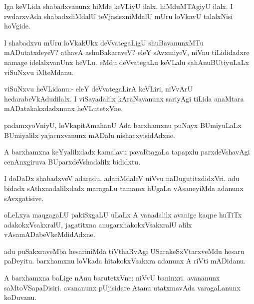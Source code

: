 \documentclass{article}
\begin{document}
\begin{mn}
Iga keVLida shabadxvanunx hiMde keVLiyU ilalx. hiMduMTAgiyU ilalx. I
rwdarxvAda shabadxdiMdalU teVjasisxniMdalU mUru loVkavU talalxNisi hoVgide.
\end{mn}

\begin{mn}
I shabadxvu mUru loVkakUkx deVvategaLigU shuBavanunxMTu mADutatxdeyeV?
athavA ashuBakaraveV? eleY sAvxmiyeV, niVnu tiLididadxre namage
idelalxvanUnx heVLu. eMdu deVvategaLu keVLalu sahAnuBUtiyuLaLx
viSuNxvu iMteMdanu.
\end{mn}

\begin{mn}
viSuNxvu heVLidanu:- eleY deVvategaLirA keVLiri, niVvArU
hedarabeVkAdudilalx. I viSayadalilx kAraNavanunx sariyAgi tiLida
anaMtara mADatakakxdadxnunx heVLutetxVne.
\end{mn}

\begin{mn}%
padamxyoVniyU, loVkapitAmahanU Ada barxhamxnu puNayx BUmiyuLaLx
BUmiyalilx yajacnxvanunx mADalu nishacxyisidAdxne.
\end{mn}

\begin{mn}
A barxhamxna keYyalilxdadx kamalavu pavaRtagaLa tapapxlu
parxdeVshavAgi cenAnxgiruva BUparxdeVshadalilx bididxtu.
\end{mn}

\begin{mn}
I doDaDx shabadxveV adaradu. adariMdaleV niVvu naDugutitxdidxVri. adu
bidadx sAthxnadalilxdadx maragaLu tamamx hUgaLa vAsaneyiMda adanunx sAvxgatisive.
\end{mn}

\begin{mn}
oLeLxya maqgagaLU pakiSxgaLU uLaLx A vanadalilx avanige kaqpe huTiTx
adakokxVsakxralU, jagatitxna anugarxhakokxVsakxralU alilx vAsamADabeVkeMdidAdxne.
\end{mn}

\begin{mn}
adu puSakxraveMba hesariniMda tiVthaRvAgi USarakeSxVtarxveMdu hesaru
paDeyitu. barxhamxnu loVkada hitakokxVsakxra adanunx A riVti mADidanu.
\end{mn}

\begin{mn}%
A barxhamxna baLige nAnu barutetxVne: niVvU baninxri. avananunx
saMtoVSapaDisiri. avananunx pUjisidare Atanu utatxmavAda varagaLanunx koDuvanu.
\end{mn}
\end{document}
